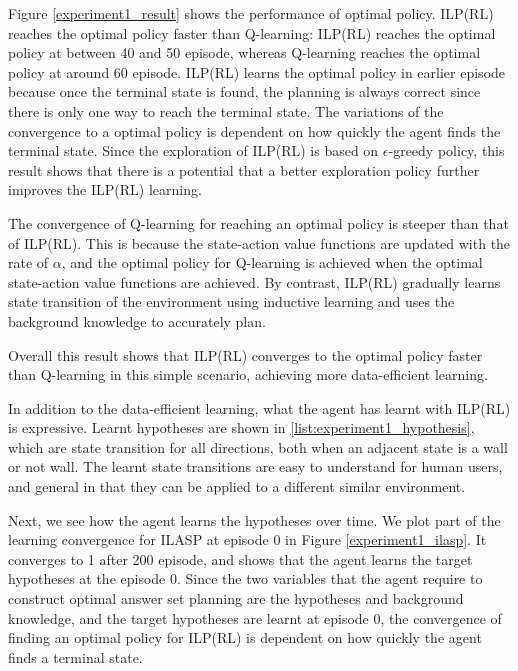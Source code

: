 Figure \ref{experiment1_result} shows the performance of optimal policy.
ILP(RL) reaches the optimal policy faster than Q-learning: ILP(RL) reaches the optimal policy at between 40 and 50 episode, 
whereas Q-learning reaches the optimal policy at around 60 episode. ILP(RL) learns the optimal policy in earlier episode because once the terminal state is found, the planning is always correct since there is only one way to reach the terminal state. The variations of the convergence to a optimal policy is dependent on how quickly the agent finds the terminal state. 
Since the exploration of ILP(RL) is based on $\epsilon$-greedy policy, this result shows that there is a potential that a better exploration policy further improves the ILP(RL) learning.

The convergence of Q-learning for reaching an optimal policy is steeper than that of ILP(RL). This is because the state-action value functions are updated with the rate of $\alpha$, and the optimal policy for Q-learning is achieved when the optimal state-action value functions are achieved. By contrast, 
ILP(RL) gradually learns state transition of the environment using inductive learning and uses the background knowledge to accurately plan. 

Overall this result shows that ILP(RL) converges to the optimal policy faster than Q-learning in this simple scenario, achieving more data-efficient learning.



In addition to the data-efficient learning, what the agent has learnt with ILP(RL) is expressive.
Learnt hypotheses are shown in \ref{list:experiment1_hypothesis}, which are state transition for all directions, both when an adjacent state is a wall or not wall. The learnt state transitions are easy to understand for human users, and general in that they can be applied to a different similar environment.

Next, we see how the agent learns the hypotheses over time. We plot part of the learning convergence for ILASP at episode 0 in Figure \ref{experiment1_ilasp}.
It converges to 1 after 200 episode, and shows that the agent learns the target hypotheses at the episode 0.
Since the two variables that the agent require to construct optimal answer set planning are the hypotheses and background knowledge, and the target hypotheses are learnt at episode 0, the convergence of finding an optimal policy for ILP(RL) is dependent on how quickly the agent finds a terminal state. 

